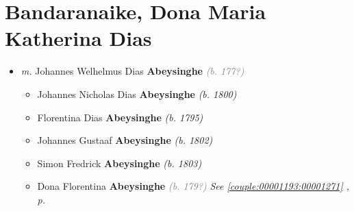 \documentclass[10pt, openany]{book}
\begin{document}
\chapter{Bandaranaike, Dona Maria Katherina Dias}
\label{00001990}
\textcolor{slmaroon}{\textit{}}
\begin{itemize}
\item{\textit{m.} Johannes Welhelmus Dias \textbf{Abeysinghe} \textcolor{gray}{\textit{(b. 177?)}}   \label{couple:00001990:00001991} \begin{itemize}
\item{Johannes Nicholas Dias \textbf{Abeysinghe} \textcolor{slorange}{\textit{(b. 1800)}}
   }
\item{Florentina Dias \textbf{Abeysinghe} \textcolor{slorange}{\textit{(b. 1795)}}
  }
\item{Johannes Gustaaf \textbf{Abeysinghe} \textcolor{slorange}{\textit{(b. 1802)}}
  }
\item{Simon Fredrick \textbf{Abeysinghe} \textcolor{slorange}{\textit{(b. 1803)}}
  }
\item{Dona Florentina \textbf{Abeysinghe} \textcolor{gray}{\textit{(b. 179?)}} \textcolor{slteal}{\textit{See  \autoref{couple:00001193:00001271} \textit{, p. \pageref{couple:00001193:00001271} }}}}
\end{itemize}}
\end{itemize}
    
\end{document}
